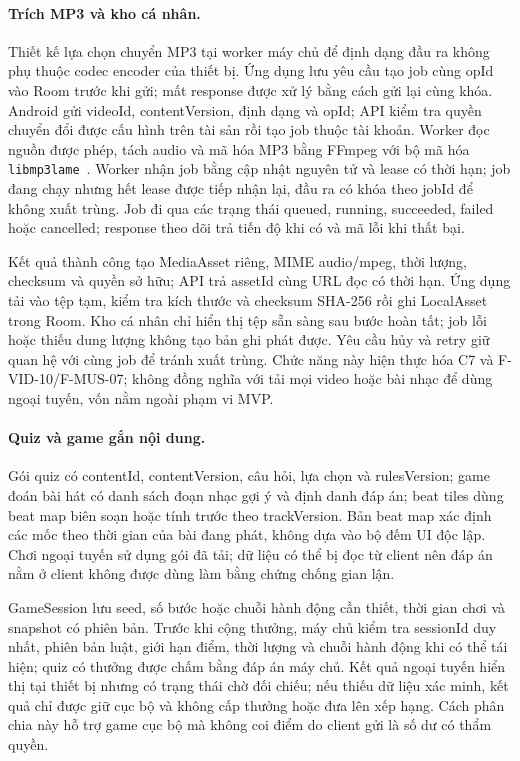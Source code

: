 \paragraph{Trích MP3 và kho cá nhân.}
Thiết kế lựa chọn chuyển MP3 tại worker máy chủ để định dạng đầu ra không phụ thuộc codec encoder của thiết bị. Ứng dụng lưu yêu cầu tạo job cùng opId vào Room trước khi gửi; mất response được xử lý bằng cách gửi lại cùng khóa. Android gửi videoId, contentVersion, định dạng và opId; API kiểm tra quyền chuyển đổi được cấu hình trên tài sản rồi tạo job thuộc tài khoản. Worker đọc nguồn được phép, tách audio và mã hóa MP3 bằng FFmpeg với bộ mã hóa \texttt{libmp3lame}~\cite{ffmpeg-codecs}. Worker nhận job bằng cập nhật nguyên tử và lease có thời hạn; job đang chạy nhưng hết lease được tiếp nhận lại, đầu ra có khóa theo jobId để không xuất trùng. Job đi qua các trạng thái queued, running, succeeded, failed hoặc cancelled; response theo dõi trả tiến độ khi có và mã lỗi khi thất bại.

Kết quả thành công tạo MediaAsset riêng, MIME audio/mpeg, thời lượng, checksum và quyền sở hữu; API trả assetId cùng URL đọc có thời hạn. Ứng dụng tải vào tệp tạm, kiểm tra kích thước và checksum SHA-256 rồi ghi LocalAsset trong Room. Kho cá nhân chỉ hiển thị tệp sẵn sàng sau bước hoàn tất; job lỗi hoặc thiếu dung lượng không tạo bản ghi phát được. Yêu cầu hủy và retry giữ quan hệ với cùng job để tránh xuất trùng. Chức năng này hiện thực hóa C7 và F-VID-10/F-MUS-07; không đồng nghĩa với tải mọi video hoặc bài nhạc để dùng ngoại tuyến, vốn nằm ngoài phạm vi MVP.

\paragraph{Quiz và game gắn nội dung.}
Gói quiz có contentId, contentVersion, câu hỏi, lựa chọn và rulesVersion; game đoán bài hát có danh sách đoạn nhạc gợi ý và định danh đáp án; beat tiles dùng beat map biên soạn hoặc tính trước theo trackVersion. Bản beat map xác định các mốc theo thời gian của bài đang phát, không dựa vào bộ đếm UI độc lập. Chơi ngoại tuyến sử dụng gói đã tải; dữ liệu có thể bị đọc từ client nên đáp án nằm ở client không được dùng làm bằng chứng chống gian lận.

GameSession lưu seed, số bước hoặc chuỗi hành động cần thiết, thời gian chơi và snapshot có phiên bản. Trước khi cộng thưởng, máy chủ kiểm tra sessionId duy nhất, phiên bản luật, giới hạn điểm, thời lượng và chuỗi hành động khi có thể tái hiện; quiz có thưởng được chấm bằng đáp án máy chủ. Kết quả ngoại tuyến hiển thị tại thiết bị nhưng có trạng thái chờ đối chiếu; nếu thiếu dữ liệu xác minh, kết quả chỉ được giữ cục bộ và không cấp thưởng hoặc đưa lên xếp hạng. Cách phân chia này hỗ trợ game cục bộ mà không coi điểm do client gửi là số dư có thẩm quyền.

